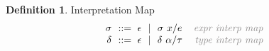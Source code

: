 \documentclass[acmsmall]{acmart}
\theoremstyle{definition}
\newtheorem{definition}{Definition}[section]
\newtheorem{property}{Property}[section]
\begin{document}
\begin{definition} Interpretation Map
  \label{def:interpretation_map}
  \[\begin{array}[t]{r@{}l@{}r}
    \nonterm{\sigma} & \is \epsilon \sep \sigma\ x \slash e 
    & \com{expr interp map}
    \\
    \nonterm{\delta} & \is \epsilon \sep \delta\ \alpha \slash \tau
    & \com{type interp map}
  \end{array}\]
\end{definition}





\end{document}
